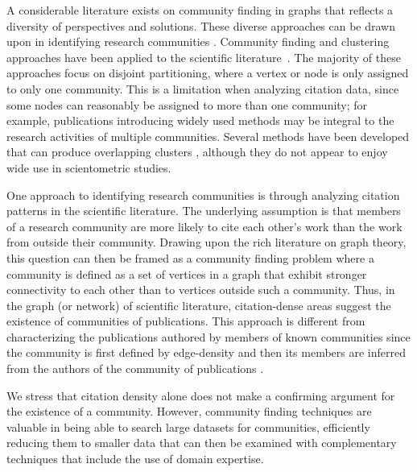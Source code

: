 \documentclass[12pt, oneside]{article}   	%
\begin{document}
	A considerable literature exists on community finding in graphs that reflects a diversity of perspectives and solutions. These diverse approaches can be drawn upon in identifying research communities \citep{Fortunato2009,FORTUNATO201075,Coscia2011,Yang2016}.  Community finding and clustering approaches have been applied to the scientific literature~\citep{Newman2006,Fortunato2009,Boyack2010,Boyack2019,Traag2019,Ahlgren2020,Chandrasekharan2021,Wedell2022}. The majority of these approaches focus on disjoint partitioning, where a vertex or node is only assigned to only one community. 
	This is a limitation when analyzing citation data, since some nodes can reasonably be assigned to more than one community; for example, publications introducing widely used methods may be integral to the research activities of multiple communities. 
	Several methods have been developed that can produce overlapping clusters \citep{Baumes2005,Palla2005,banerjee2005model,Cleuziou2008,Lancichinetti2009,Lu2012}, although they do not appear to enjoy wide use in scientometric studies. 
	
	One approach to identifying research communities is through analyzing citation patterns in the scientific literature. The underlying assumption is that members of a research community are more likely to cite each other's work than the work from outside their community.  Drawing upon the rich literature on graph theory, this question can then be framed as a community finding problem where a community is defined as a set of vertices in a graph that exhibit stronger connectivity to each other than to vertices outside such a community. Thus, in the graph (or network) of scientific literature, citation-dense areas suggest the existence of communities of publications. This approach is different from characterizing the publications authored by members of known communities \citep{Price1966,crane1972invisible,smallspecialties1979,Mullins1985} since the community is first defined by edge-density and then 
	its members are inferred from the authors of the community of publications \citep{Chandrasekharan2021,Wedell2022}.
	
	We stress that citation density alone does not make a confirming argument for the existence of a community. However, community finding techniques are valuable in being able to search large datasets for communities, efficiently reducing them to smaller data that can then be examined with complementary techniques that include the use of domain expertise.
	
\end{document}
